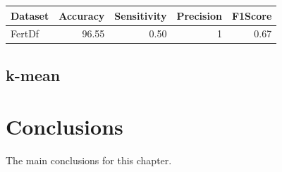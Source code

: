 \begin{table}[ht]
\centering
\begin{tabular}{lrrrr}
  \hline
Dataset & Accuracy & Sensitivity & Precision & F1Score \\ 
  \hline
FertDf & 96.55 & 0.50 &   1 & 0.67 \\ 
   \hline
\end{tabular}
\end{table}


\subsection{k-mean}

\section{Conclusions}

The main conclusions for this chapter.


